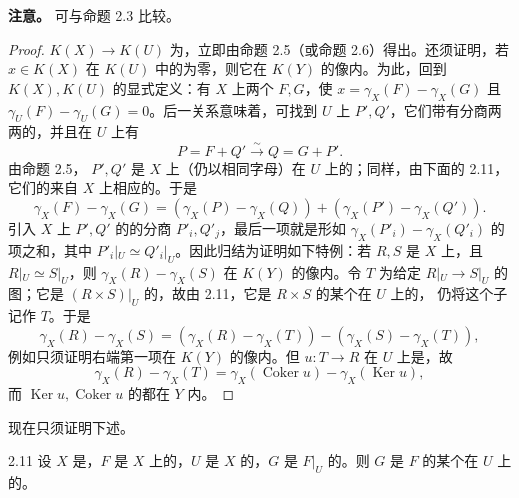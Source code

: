 \textbf{注意。} 可与命题 2.3 比较。
\begin{proof}
$K(X)\to K(U)$ 为，立即由命题 2.5（或命题 2.6）得出。还须证明，若 $x\in K(X)$ 在 $K(U)$ 中的为零，则它在 $K(Y)$ 的像内。为此，回到 $K(X),K(U)$ 的显式定义：有 $X$ 上两个 $F,G$，使 $x=\gamma_X(F)-\gamma_X(G)$ 且 $\gamma_U(F)-\gamma_U(G)=0$。后一关系意味着，可找到 $U$ 上 $P',Q'$，它们带有分商两两的，并且在 $U$ 上有
\[
P=F+Q'\xrightarrow{\sim}Q=G+P'.
\]
由命题 2.5， $P',Q'$ 是 $X$ 上（仍以相同字母）在 $U$ 上的；同样，由下面的 2.11，它们的来自 $X$ 上相应的。于是
\[
\gamma_X(F)-\gamma_X(G)=(\gamma_X(P)-\gamma_X(Q))+(\gamma_X(P')-\gamma_X(Q')).
\]
引入 $X$ 上 $P',Q'$ 的的分商 $P'_i,Q'_j$，最后一项就是形如 $\gamma_X(P'_i)-\gamma_X(Q'_i)$ 的项之和，其中 $P'_i|_U\simeq Q'_i|_U$。因此归结为证明如下特例：若 $R,S$ 是 $X$ 上，且 $R|_U\simeq S|_U$，则 $\gamma_X(R)-\gamma_X(S)$ 在 $K(Y)$ 的像内。令 $T$ 为给定 $R|_U\to S|_U$ 的图；它是 $(R\times S)|_U$ 的，故由 2.11，它是 $R\times S$ 的某个在 $U$ 上的，
仍将这个子记作 $T$。于是
\[
\gamma_X(R)-\gamma_X(S)=(\gamma_X(R)-\gamma_X(T))-(\gamma_X(S)-\gamma_X(T)),
\]
例如只须证明右端第一项在 $K(Y)$ 的像内。但 $u:T\to R$ 在 $U$ 上是，故
\[
\gamma_X(R)-\gamma_X(T)=\gamma_X(\operatorname{Coker}u)-\gamma_X(\operatorname{Ker}u),
\]
而 $\operatorname{Ker}u,\operatorname{Coker}u$ 的都在 $Y$ 内。
\end{proof}
现在只须证明下述。
\begin{SGAresult}{}{2.11}
设 $X$ 是，$F$ 是 $X$ 上的，$U$ 是 $X$ 的，$G$ 是 $F|_U$ 的。则 $G$ 是 $F$ 的某个在 $U$ 上的。
\end{SGAresult}
